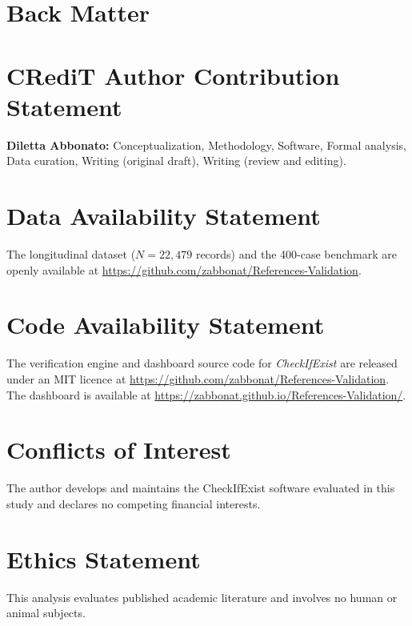 \documentclass[11pt, a4paper]{article}
\begin{document}
\section*{Back Matter}

\section*{CRediT Author Contribution Statement}
\textbf{Diletta Abbonato:} Conceptualization, Methodology, Software, Formal analysis, Data curation, Writing (original draft), Writing (review and editing).

\section*{Data Availability Statement}
The longitudinal dataset ($N = 22{,}479$ records) and the 400-case benchmark are openly available at \url{https://github.com/zabbonat/References-Validation}.

\section*{Code Availability Statement}
The verification engine and dashboard source code for \textit{CheckIfExist} are released under an MIT licence at \url{https://github.com/zabbonat/References-Validation}. The dashboard is available at \url{https://zabbonat.github.io/References-Validation/}.

\section*{Conflicts of Interest}
The author develops and maintains the CheckIfExist software evaluated in this study and declares no competing financial interests.

\section*{Ethics Statement}
This analysis evaluates published academic literature and involves no human or animal subjects.



\end{document}
